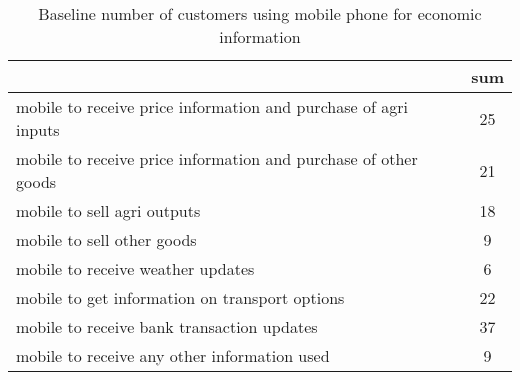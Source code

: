 \begin{table}[htbp]\centering
\def\sym#1{\ifmmode^{#1}\else\(^{#1}\)\fi}
\caption{Baseline number of customers using mobile phone for economic information \label{tab:"label"}}
\begin{tabular*}{0.9\hsize}{@{\hskip\tabcolsep\extracolsep\fill}l*{1}{c}}
\toprule
                                &      sum\\
\midrule
mobile to receive price information and purchase of agri inputs&       25\\
mobile to receive price information and purchase of other goods&       21\\
mobile to sell agri outputs     &       18\\
mobile to sell other goods      &        9\\
mobile to receive weather updates&        6\\
mobile to get information on transport options&       22\\
mobile to receive bank transaction updates&       37\\
mobile to receive any other information used&        9\\
\bottomrule
\end{tabular*}
\end{table}
